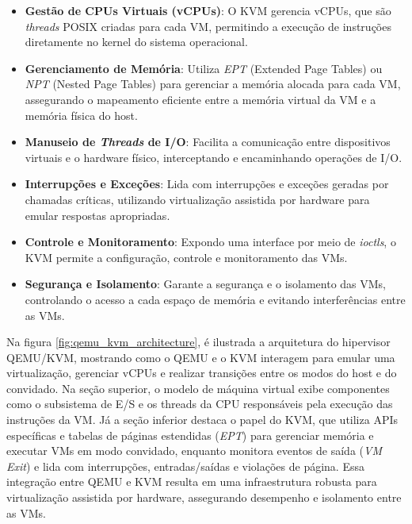 \begin{itemize}
    \item \textbf{Gestão de CPUs Virtuais (vCPUs)}: O KVM gerencia vCPUs, que são \textit{threads} POSIX criadas para cada VM, permitindo a execução de instruções diretamente no kernel do sistema operacional.
  
    \item \textbf{Gerenciamento de Memória}: Utiliza \textit{EPT} (Extended Page Tables) ou \textit{NPT} (Nested Page Tables) para gerenciar a memória alocada para cada VM, assegurando o mapeamento eficiente entre a memória virtual da VM e a memória física do host.

    \item \textbf{Manuseio de \textit{Threads} de I/O}: Facilita a comunicação entre dispositivos virtuais e o hardware físico, interceptando e encaminhando operações de I/O.

    \item \textbf{Interrupções e Exceções}: Lida com interrupções e exceções geradas por chamadas críticas, utilizando virtualização assistida por hardware para emular respostas apropriadas.

    \item \textbf{Controle e Monitoramento}: Expondo uma interface por meio de \textit{ioctls}, o KVM permite a configuração, controle e monitoramento das VMs.

    \item \textbf{Segurança e Isolamento}: Garante a segurança e o isolamento das VMs, controlando o acesso a cada espaço de memória e evitando interferências entre as VMs.
\end{itemize}

Na figura \ref{fig:qemu_kvm_architecture}, é ilustrada a arquitetura do hipervisor QEMU/KVM, mostrando como o QEMU e o KVM interagem para emular uma virtualização, gerenciar vCPUs e realizar transições entre os modos do host e do convidado. Na seção superior, o modelo de máquina virtual exibe componentes como o subsistema de E/S e os threads da CPU responsáveis pela execução das instruções da VM. Já a seção inferior destaca o papel do KVM, que utiliza APIs específicas e tabelas de páginas estendidas (\textit{EPT}) para gerenciar memória e executar VMs em modo convidado, enquanto monitora eventos de saída (\textit{VM Exit}) e lida com interrupções, entradas/saídas e violações de página. Essa integração entre QEMU e KVM resulta em uma infraestrutura robusta para virtualização assistida por hardware, assegurando desempenho e isolamento entre as VMs.

